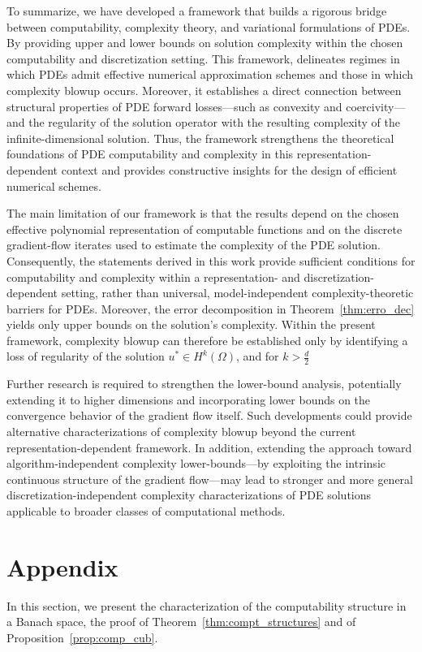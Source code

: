 \documentclass[pdflatex]{sn-jnl}%
\begin{document}
To summarize, we have developed a framework that builds a rigorous bridge between computability, complexity theory, and variational formulations of PDEs. By providing upper and lower bounds on solution complexity within the chosen computability and discretization setting. This framework, delineates regimes in which PDEs admit effective numerical approximation schemes and those in which complexity blowup occurs. Moreover, it establishes a direct connection between structural properties of PDE forward losses—such as convexity and coercivity—and the regularity of the solution operator with the resulting complexity of the infinite-dimensional solution. Thus, the framework strengthens the theoretical foundations of PDE computability and complexity in this representation-dependent context and provides constructive insights for the design of efficient numerical schemes.

The main limitation of our framework is that the results depend on the chosen effective polynomial representation of computable functions and on the discrete gradient-flow iterates used to estimate the complexity of the PDE solution. Consequently, the statements derived in this work provide sufficient conditions for computability and complexity within a representation- and discretization-dependent setting, rather than universal, model-independent complexity-theoretic barriers for PDEs. Moreover, the error decomposition in Theorem~\ref{thm:erro_dec} yields only upper bounds on the solution’s complexity. Within the present framework, complexity blowup can therefore be established only by identifying a loss of regularity of the solution $u^* \in H^k(\Omega)$, and for $k>\frac{d}{2}$

Further research is required to strengthen the lower-bound analysis, potentially extending it to higher dimensions and incorporating lower bounds on the convergence behavior of the gradient flow itself. Such developments could provide alternative characterizations of complexity blowup beyond the current representation-dependent framework. In addition, extending the approach toward algorithm-independent complexity lower-bounds—by exploiting the intrinsic continuous structure of the gradient flow—may lead to stronger and more general discretization-independent complexity characterizations of PDE solutions applicable to broader classes of computational methods.

\appendix
\section{Appendix}\label{appendix_A}
In this section, we present the characterization of the computability structure in a Banach space, the proof of Theorem~\ref{thm:compt_structures} and of Proposition~\ref{prop:comp_cub}. 
\end{document}
